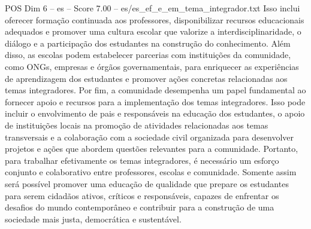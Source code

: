 \begin{textsample}{POS Dim 6 – es – Score 7.00 – es/es\_ef\_e\_em\_tema\_integrador.txt}
Isso inclui oferecer formação continuada aos professores, disponibilizar recursos educacionais adequados e promover uma cultura escolar que valorize a interdisciplinaridade, o diálogo e a participação dos estudantes na construção do conhecimento.
Além disso, as escolas podem estabelecer parcerias com instituições da comunidade, como ONGs, empresas e órgãos governamentais, para enriquecer as experiências de aprendizagem dos estudantes e promover ações concretas relacionadas aos temas integradores.
Por fim, a comunidade desempenha um papel fundamental ao fornecer apoio e recursos para a implementação dos temas integradores.
Isso pode incluir o envolvimento de pais e responsáveis na educação dos estudantes, o apoio de instituições locais na promoção de atividades relacionadas aos temas transversais e a colaboração com a sociedade civil organizada para desenvolver projetos e ações que abordem questões relevantes para a comunidade.
Portanto, para trabalhar efetivamente os temas integradores, é necessário um esforço conjunto e colaborativo entre professores, escolas e comunidade.
Somente assim será possível promover uma educação de qualidade que prepare os estudantes para serem cidadãos ativos, críticos e responsáveis, capazes de enfrentar os desafios do mundo contemporâneo e contribuir para a construção de uma sociedade mais justa, democrática e sustentável.

\end{textsample}
